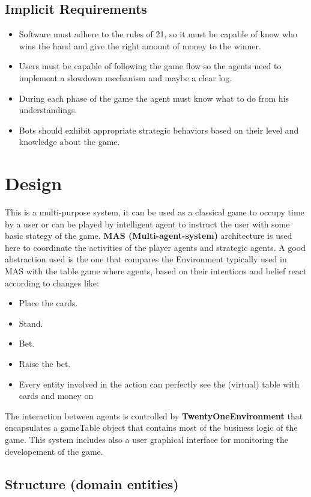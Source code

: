 \section{Implicit Requirements}
\begin{itemize}
   \item Software must adhere to the rules of 21, so it must be capable of know who wins the hand and give the right amount of money to the winner.
   \item Users must be capable of following the game flow so the agents need to implement a slowdown mechanism and maybe a clear log.
   \item During each phase of the game the agent must know what to do from his understandings.
   \item Bots should exhibit appropriate strategic behaviors based on their level and knowledge about the game.
\end{itemize}

\chapter{Design}

This is a multi-purpose system, it can be used as a classical game to occupy time by a user or can be played by intelligent agent to instruct the user with some basic stategy of the game. \textbf{MAS (Multi-agent-system)} architecture is used here to coordinate the activities of the player agents and strategic agents. A good abstraction used is the one that compares the Environment typically used in MAS with the table game where agents, based on their intentions and belief react according to changes like: 
\begin{itemize}
    \item Place the cards.
    \item Stand.
    \item Bet.
    \item Raise the bet.
    \item Every entity involved in the action can perfectly see the (virtual) table with cards and money on
 \end{itemize}

The interaction between agents is controlled by \textbf{TwentyOneEnvironment} that encapsulates a gameTable object that contains most of the business logic of the game. This system includes also a user graphical interface for monitoring the developement of the game.

\section{Structure (domain entities)}


